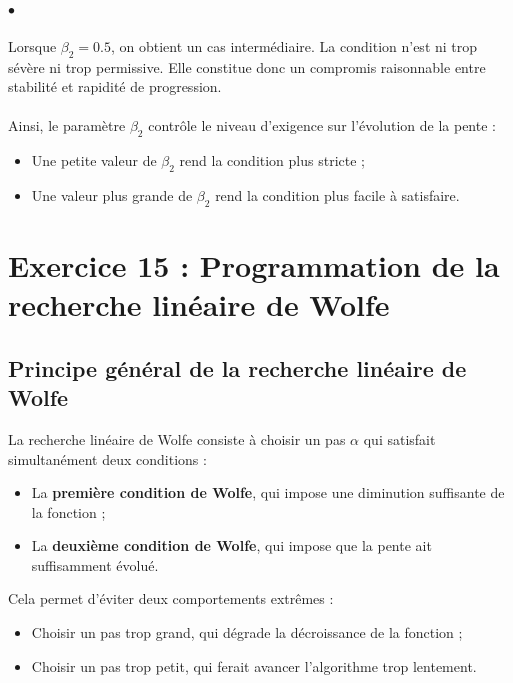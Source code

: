\documentclass[a4paper,12pt]{article}
\begin{document}
	\paragraph{$\bullet$}Lorsque $\beta_2=0.5$, on obtient un cas intermédiaire. La condition n'est ni trop sévère ni trop permissive. Elle constitue donc un compromis raisonnable entre stabilité et rapidité de progression.
	
	\paragraph{}Ainsi, le paramètre $\beta_2$ contrôle le niveau d'exigence sur l'évolution de la pente :
	\begin{itemize}
		\item Une petite valeur de $\beta_2$ rend la condition plus stricte ;
		\item Une valeur plus grande de $\beta_2$ rend la condition plus facile à satisfaire.
	\end{itemize}
	
	\section{Exercice 15 : Programmation de la recherche linéaire de Wolfe}
	
	\subsection{Principe général de la recherche linéaire de Wolfe}
	
La recherche linéaire de Wolfe \cite{wolfe1969,wolfe1971,nocedal2006} consiste à choisir un pas $\alpha$ qui satisfait simultanément deux conditions :
	\begin{itemize}
		\item La \textbf{première condition de Wolfe}, qui impose une diminution suffisante de la fonction ;
		\item La \textbf{deuxième condition de Wolfe}, qui impose que la pente ait suffisamment évolué.
	\end{itemize}
	
	Cela permet d'éviter deux comportements extrêmes :
	\begin{itemize}
		\item[$\bullet$] Choisir un pas trop grand, qui dégrade la décroissance de la fonction ;
		\item[$\bullet$] Choisir un pas trop petit, qui ferait avancer l'algorithme trop lentement.
	\end{itemize}
	
\end{document}
